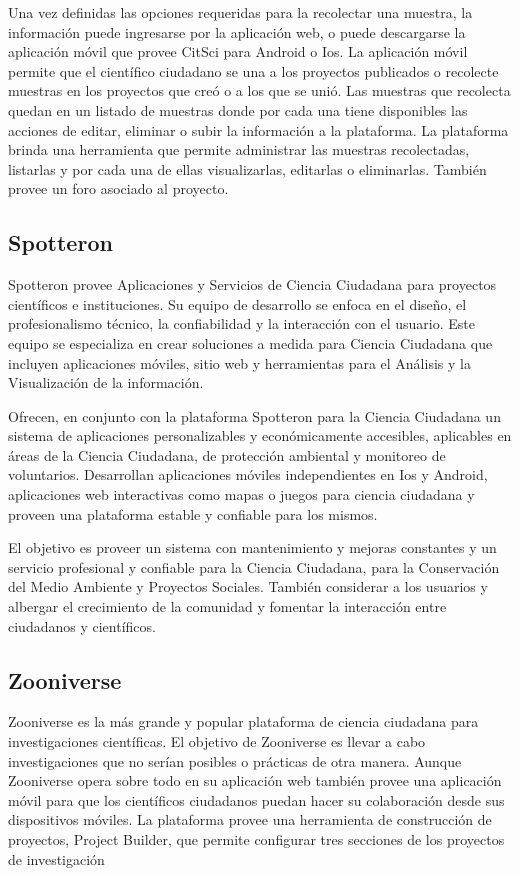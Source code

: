 Una vez definidas las opciones requeridas para la recolectar una muestra, la información puede ingresarse por la aplicación web, o puede descargarse la aplicación móvil que provee CitSci para Android o Ios. La aplicación móvil permite que el científico ciudadano se una a los proyectos publicados o recolecte muestras en los proyectos que creó o a los que se unió. Las muestras que recolecta quedan en un listado de muestras donde por cada una tiene disponibles las acciones de editar, eliminar o subir la información a la plataforma.  		
La plataforma brinda una herramienta que permite administrar las muestras recolectadas, listarlas y por cada una de ellas visualizarlas, editarlas o eliminarlas. También provee un foro asociado al proyecto. 	

\subsection{Spotteron}		

Spotteron \cite{spotteron} provee Aplicaciones y Servicios de Ciencia Ciudadana para proyectos científicos e instituciones. Su equipo de desarrollo se enfoca en el diseño, el profesionalismo técnico, la confiabilidad y la interacción con el usuario. Este equipo se especializa en crear soluciones a medida para Ciencia Ciudadana que incluyen aplicaciones móviles, sitio web y herramientas para el Análisis y la Visualización de la información. 

Ofrecen, en conjunto con la plataforma Spotteron para la Ciencia Ciudadana un sistema de aplicaciones personalizables y económicamente accesibles, aplicables en áreas de la Ciencia Ciudadana, de protección ambiental y monitoreo de voluntarios. Desarrollan aplicaciones móviles independientes en Ios y Android, aplicaciones web interactivas como mapas o juegos para ciencia ciudadana y proveen una plataforma estable y confiable para los mismos.

El objetivo es proveer un sistema con mantenimiento y mejoras constantes y un servicio profesional y confiable para la Ciencia Ciudadana, para la Conservación del Medio Ambiente y Proyectos Sociales. También considerar a los usuarios y albergar el crecimiento de la comunidad y fomentar la interacción entre ciudadanos y científicos.

\subsection{Zooniverse}	

Zooniverse \cite{Zooniverse} es la más grande y popular plataforma de ciencia ciudadana para investigaciones científicas. El objetivo de Zooniverse es llevar a cabo investigaciones  que no serían posibles o prácticas de otra manera. Aunque Zooniverse opera sobre todo en su aplicación web \cite{zooniverseMobile} también provee una aplicación móvil para que los científicos ciudadanos puedan hacer su colaboración desde sus dispositivos móviles. 
La plataforma provee una herramienta de construcción de proyectos, Project Builder, que permite configurar tres secciones de los proyectos de investigación

